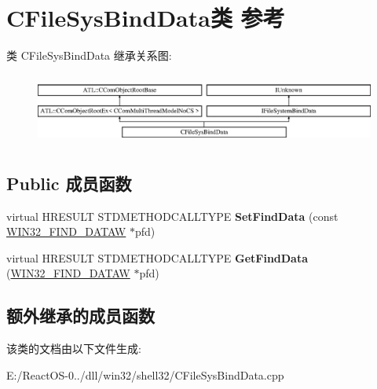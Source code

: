 \hypertarget{class_c_file_sys_bind_data}{}\section{C\+File\+Sys\+Bind\+Data类 参考}
\label{class_c_file_sys_bind_data}
类 C\+File\+Sys\+Bind\+Data 继承关系图\+:\begin{figure}[H]
\begin{center}
\leavevmode
\includegraphics[height=2.386364cm]{class_c_file_sys_bind_data}
\end{center}
\end{figure}
\subsection*{Public 成员函数}
\begin{DoxyCompactItemize}
\item 
\mbox{\label{class_c_file_sys_bind_data_aca0fb08e155c3767560b0ded7b4b7021}} 
virtual H\+R\+E\+S\+U\+LT S\+T\+D\+M\+E\+T\+H\+O\+D\+C\+A\+L\+L\+T\+Y\+PE {\bfseries Set\+Find\+Data} (const \hyperlink{struct_w_i_n32___f_i_n_d___d_a_t_a_a}{W\+I\+N32\+\_\+\+F\+I\+N\+D\+\_\+\+D\+A\+T\+AW} $\ast$pfd)
\item 
\mbox{\label{class_c_file_sys_bind_data_abcd48bb5b62cf64ae3656f5252b3b7f5}} 
virtual H\+R\+E\+S\+U\+LT S\+T\+D\+M\+E\+T\+H\+O\+D\+C\+A\+L\+L\+T\+Y\+PE {\bfseries Get\+Find\+Data} (\hyperlink{struct_w_i_n32___f_i_n_d___d_a_t_a_a}{W\+I\+N32\+\_\+\+F\+I\+N\+D\+\_\+\+D\+A\+T\+AW} $\ast$pfd)
\end{DoxyCompactItemize}
\subsection*{额外继承的成员函数}


该类的文档由以下文件生成\+:\begin{DoxyCompactItemize}
\item 
E\+:/\+React\+O\+S-\/0../dll/win32/shell32/C\+File\+Sys\+Bind\+Data.\+cpp\end{DoxyCompactItemize}
